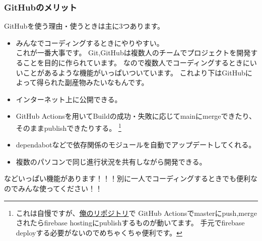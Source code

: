 \documentclass[dvipdfmx,jb5]{jreport}
\begin{document}
\subsubsection{GitHubのメリット}
GitHubを使う理由・使うときは主に3つあります。
\begin{itemize}
      \item みんなでコーディングするときにやりやすい。\\
            これが一番大事です。
            Git,GitHubは複数人のチームでプロジェクトを開発することを目的に作られています。
            なので複数人でコーディングするときにいいことがあるような機能がいっぱいついています。
            これより下はGitHubによって得られた副産物みたいなもんです。
      \item インターネット上に公開できる。
      \item GitHub Actionsを用いてBuildの成功・失敗に応じてmainにmergeできたり、そのままpublishできたりする。
            \footnote{これは自慢ですが、\href{https://github.com/akimasa-l/hide4063}{俺のリポジトリ}で
                  GitHub Actionsでmasterにpush,mergeされたらfirebase hostingにpublishするものが動いてます。
                  手元でfirebase deployする必要がないのでめちゃくちゃ便利です。}
      \item dependabotなどで依存関係のモジュールを自動でアップデートしてくれる。
      \item 複数のパソコンで同じ進行状況を共有しながら開発できる。
\end{itemize}
などいっぱい機能があります！！！別に一人でコーディングするときでも便利なのでみんな使ってください！！
\end{document}

